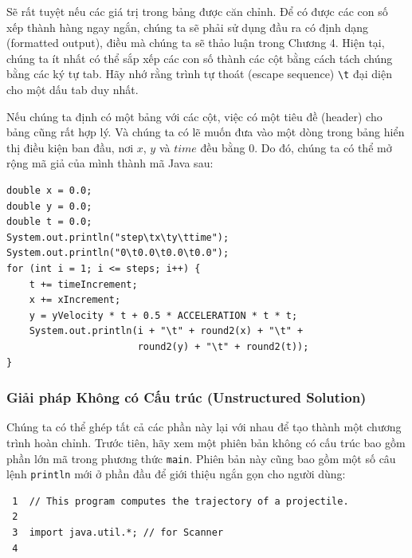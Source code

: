 Sẽ rất tuyệt nếu các giá trị trong bảng được căn chỉnh. Để có được các
con số xếp thành hàng ngay ngắn, chúng ta sẽ phải sử dụng đầu ra có định
dạng (formatted output), điều mà chúng ta sẽ thảo luận trong Chương 4.
Hiện tại, chúng ta ít nhất có thể sắp xếp các con số thành các cột bằng
cách tách chúng bằng các ký tự tab. Hãy nhớ rằng trình tự thoát (escape
sequence) \texttt{\textbackslash{}t} đại diện cho một dấu tab duy nhất.

Nếu chúng ta định có một bảng với các cột, việc có một tiêu đề (header)
cho bảng cũng rất hợp lý. Và chúng ta có lẽ muốn đưa vào một dòng trong
bảng hiển thị điều kiện ban đầu, nơi \(x\), \(y\) và \(time\) đều bằng
\(0\). Do đó, chúng ta có thể mở rộng mã giả của mình thành mã Java sau:

\begin{verbatim}
double x = 0.0;
double y = 0.0;
double t = 0.0;
System.out.println("step\tx\ty\ttime");
System.out.println("0\t0.0\t0.0\t0.0");
for (int i = 1; i <= steps; i++) {
    t += timeIncrement;
    x += xIncrement;
    y = yVelocity * t + 0.5 * ACCELERATION * t * t;
    System.out.println(i + "\t" + round2(x) + "\t" +
                       round2(y) + "\t" + round2(t));
}
\end{verbatim}

\subsubsection{Giải pháp Không có Cấu trúc (Unstructured
Solution)}\label{giux1ea3i-phuxe1p-khuxf4ng-cuxf3-cux1ea5u-truxfac-unstructured-solution}

Chúng ta có thể ghép tất cả các phần này lại với nhau để tạo thành một
chương trình hoàn chỉnh. Trước tiên, hãy xem một phiên bản không có cấu
trúc bao gồm phần lớn mã trong phương thức \texttt{main}. Phiên bản này
cũng bao gồm một số câu lệnh \texttt{println} mới ở phần đầu để giới
thiệu ngắn gọn cho người dùng:

\begin{verbatim}
 1  // This program computes the trajectory of a projectile.
 2
 3  import java.util.*; // for Scanner
 4
\end{verbatim}

